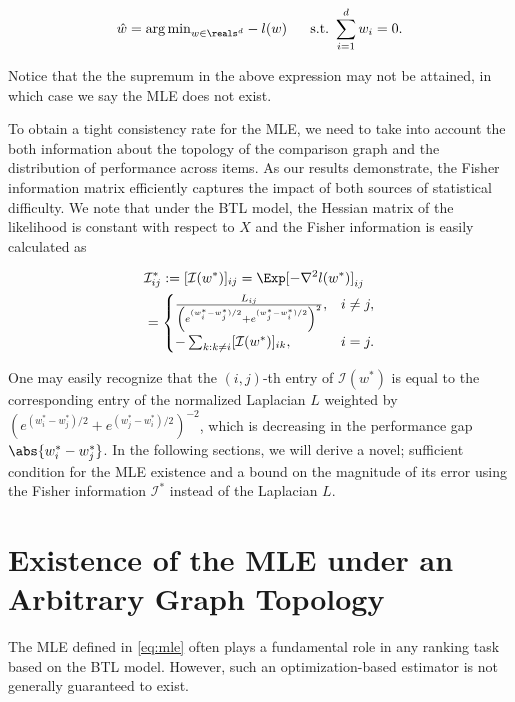 \begin{equation} \label{eq:mle}
    \hat{w} = {\arg\min}_{w \in \reals^d} -l(w) ~~~~~ \text{s.t.} ~ \sum_{i=1}^d w_i = 0.
\end{equation}

Notice that the the supremum in the above expression may not be attained, in which case we say the MLE does not exist. 

To obtain a tight consistency rate for the MLE, we need to take into account the both information about the topology of the comparison graph and the distribution of performance across items. As our results demonstrate, the Fisher information  matrix efficiently captures the impact of both sources of statistical difficulty. We note that under the BTL model, the Hessian matrix of the likelihood is constant with respect to $X$ and the Fisher information is easily calculated as

\begin{equation}
\begin{split}
    & \mathcal{I}^*_{ij} := [\mathcal{I}(w^*)]_{ij} = \Exp[-\nabla^2 l(w^*)]_{ij} \\
    & = \begin{cases}
        \frac{L_{ij}}{\left(e^{(w^*_i - w^*_j)/2} + e^{(w^*_j - w^*_i)/2}\right)^2}, & i \neq j, \\
        -\sum_{k: k \neq i} [\mathcal{I}(w^*)]_{ik}, & i = j.
    \end{cases}
\end{split}
\label{eq:Fisher.info}
\end{equation}

One may easily recognize that the $(i,j)$-th entry of $\mathcal{I}(w^*)$ is equal to the corresponding entry of the normalized Laplacian $L$ weighted by $(e^{(w^*_i - w^*_j)/2} + e^{(w^*_j - w^*_i)/2})^{-2}$, which is decreasing in the performance gap $\abs{w^*_i - w^*_j}$. In the following sections, we will derive a novel; sufficient condition for the MLE existence and a bound on the magnitude of its error using the Fisher information $\mathcal{I}^*$ instead of the Laplacian $L$.

\section{Existence of the MLE under an Arbitrary Graph Topology} \label{sec:existence}

The MLE defined in \ref{eq:mle} often plays a fundamental role in any ranking task based on the BTL model. However, such an optimization-based estimator is not generally guaranteed to exist. 

